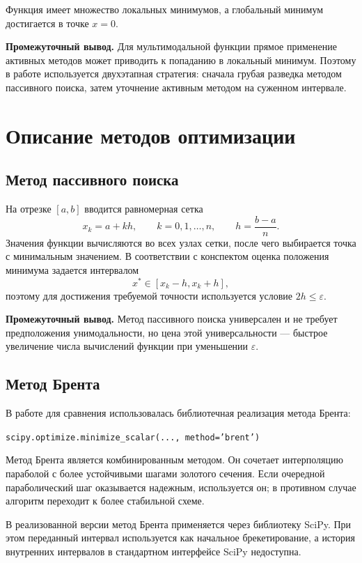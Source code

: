 \documentclass[14pt,a4paper]{extarticle}
\begin{document}
Функция имеет множество локальных минимумов, а глобальный минимум достигается в точке $x = 0$.

\textbf{Промежуточный вывод.} Для мультимодальной функции прямое применение активных методов может приводить к попаданию в локальный минимум. Поэтому в работе используется двухэтапная стратегия: сначала грубая разведка методом пассивного поиска, затем уточнение активным методом на суженном интервале.

\section{Описание методов оптимизации}

\subsection{Метод пассивного поиска}

На отрезке $[a, b]$ вводится равномерная сетка
\[
x_k = a + kh, \qquad k = 0, 1, \dots, n, \qquad h = \frac{b-a}{n}.
\]
Значения функции вычисляются во всех узлах сетки, после чего выбирается точка с минимальным значением. В соответствии с конспектом оценка положения минимума задается интервалом
\[
x^* \in [x_k - h, x_k + h],
\]
поэтому для достижения требуемой точности используется условие $2h \le \varepsilon$.

\textbf{Промежуточный вывод.} Метод пассивного поиска универсален и не требует предположения унимодальности, но цена этой универсальности --- быстрое увеличение числа вычислений функции при уменьшении $\varepsilon$.

\subsection{Метод Брента}

В работе для сравнения использовалась библиотечная реализация метода Брента:
\begin{center}
\texttt{scipy.optimize.minimize\_scalar(..., method='brent')}
\end{center}

Метод Брента является комбинированным методом. Он сочетает интерполяцию параболой с более устойчивыми шагами золотого сечения. Если очередной параболический шаг оказывается надежным, используется он; в противном случае алгоритм переходит к более стабильной схеме.

В реализованной версии метод Брента применяется через библиотеку SciPy. При этом переданный интервал используется как начальное брекетирование, а история внутренних интервалов в стандартном интерфейсе SciPy недоступна.
\end{document}
